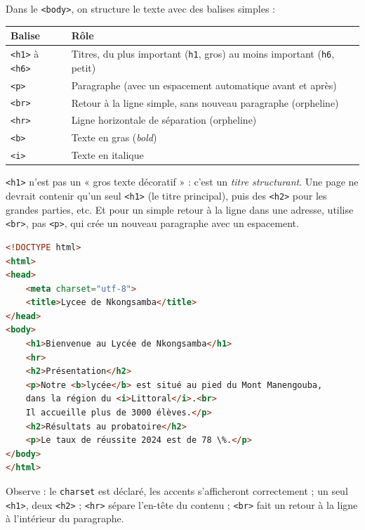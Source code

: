 \documentclass[11pt]{article}
\newcounter{popsec}
\newcounter{popsub}
\newcommand{\courssub}[1]{%
  \stepcounter{popsub}%
  \par\vspace{9pt}\noindent{\popxbold\fontsize{11.5}{13}\selectfont\color{popink}{\color{poporange}\thepopsec.\thepopsub}\hspace{6pt}#1}\par\nopagebreak\vspace{4pt}
}
\begin{document}
\courssub{Les balises de texte de base}

Dans le \texttt{<body>}, on structure le texte avec des balises simples :

\begin{center}
\begin{tabularx}{\linewidth}{|l|X|}
\hline
\rowcolor{popblueL} \textbf{Balise} & \textbf{Rôle} \\
\hline
\texttt{<h1>} à \texttt{<h6>} & Titres, du plus important (\texttt{h1}, gros) au moins important (\texttt{h6}, petit) \\
\hline
\texttt{<p>} & Paragraphe (avec un espacement automatique avant et après) \\
\hline
\texttt{<br>} & Retour à la ligne simple, sans nouveau paragraphe (orpheline) \\
\hline
\texttt{<hr>} & Ligne horizontale de séparation (orpheline) \\
\hline
\texttt{<b>} & Texte en gras (\emph{bold}) \\
\hline
\texttt{<i>} & Texte en italique \\
\hline
\end{tabularx}
\end{center}

\begin{attention}
\texttt{<h1>} n'est pas un « gros texte décoratif » : c'est un \emph{titre structurant}. Une page ne devrait contenir qu'un seul \texttt{<h1>} (le titre principal), puis des \texttt{<h2>} pour les grandes parties, etc. Et pour un simple retour à la ligne dans une adresse, utilise \texttt{<br>}, pas \texttt{<p>}, qui crée un nouveau paragraphe avec un espacement.
\end{attention}

\begin{exemplebox}
\begin{lstlisting}[language=HTML]
<!DOCTYPE html>
<html>
<head>
    <meta charset="utf-8">
    <title>Lycee de Nkongsamba</title>
</head>
<body>
    <h1>Bienvenue au Lycée de Nkongsamba</h1>
    <hr>
    <h2>Présentation</h2>
    <p>Notre <b>lycée</b> est situé au pied du Mont Manengouba,
    dans la région du <i>Littoral</i>.<br>
    Il accueille plus de 3000 élèves.</p>
    <h2>Résultats au probatoire</h2>
    <p>Le taux de réussite 2024 est de 78 \%.</p>
</body>
</html>
\end{lstlisting}
Observe : le \texttt{charset} est déclaré, les accents s'afficheront correctement ; un seul \texttt{<h1>}, deux \texttt{<h2>} ; \texttt{<hr>} sépare l'en-tête du contenu ; \texttt{<br>} fait un retour à la ligne à l'intérieur du paragraphe.
\end{exemplebox}
\end{document}
